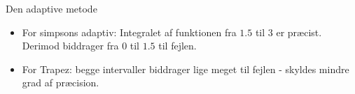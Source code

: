 \begin{frame}{Den adaptive metode}
    \begin{itemize}
        \item For simpsons adaptiv: Integralet af funktionen fra $1.5$ til $3$ er præcist. 
        Derimod biddrager fra $0$ til $1.5$ til fejlen.
        \item For Trapez:  begge intervaller biddrager lige meget til fejlen - skyldes mindre grad af præcision.
    \end{itemize}
\end{frame}